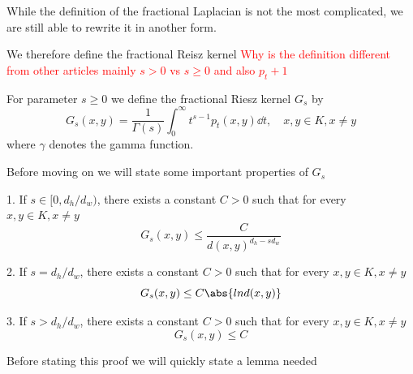 While the definition of the fractional Laplacian is not the most complicated, we are still able to rewrite it in another form.

We therefore define the fractional Reisz kernel \textcolor{red}{Why is the definition different from other articles mainly $s > 0$ vs $s \geq 0$ and also $p_t +1$}
\begin{defi}
	For parameter $s \geq 0$ we define the fractional Riesz kernel $G_s$ by
	\begin{equation}
		G_{s}(x,y) = \frac{1}{\Gamma(s)}\int_{0}^{\infty} t^{s-1}p_t(x,y) \dd t, \quad x, y \in K, x \neq y
	\end{equation}
	where $\gamma$ denotes the gamma function.
\end{defi}
Before moving on we will state some important properties of $G_s$ 
\begin{prop}
	\begin{enumerate}\label{boundsOfRieszKernel}
		1. If $s \in [0, d_h/d_w)$, there exists a constant $C > 0$ such that for every $x,y \in K, x \neq y$
		\begin{equation}
			G_s(x,y) \leq \frac{C}{d(x,y)^{d_h-sd_w}}
		\end{equation}
		
		2. If $s = d_h/d_w$, there exists a constant $C > 0$ such that for every $x,y \in K, x \neq y$
			\begin{equation}
				G_s(x,y) \leq C \abs{ln d(x,y)}
			\end{equation}
			
		3. If $s > d_h/d_w$, there exists a constant $C > 0$ such that for every $x,y \in K, x \neq y$
		\begin{equation}
			G_s(x,y) \leq C 
		\end{equation}
	\end{enumerate}
\end{prop}

Before stating this proof we will quickly state a lemma needed

